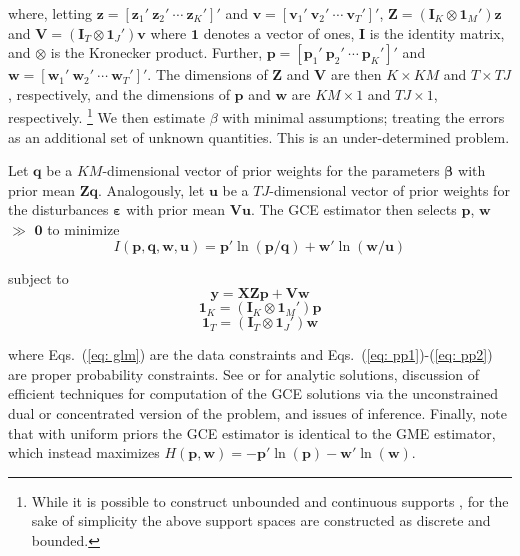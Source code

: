 \documentclass{elsarticle}
\begin{document}
\noindent
where, letting $\mathbf{z}=[\mathbf{z}_1' ~ \mathbf{z}_2' ~ \cdots ~ 
\mathbf{z}_K' ]'$ and $\mathbf{v}=[\mathbf{v}_1' ~ \mathbf{v}_2' ~ 
\cdots ~ \mathbf{v}_T' ]'$, 
$\mathbf{Z}= (\mathbf{I}_K \otimes \mathbf{1}_M')\mathbf{z}$ and
$\mathbf{V}= (\mathbf{I}_T \otimes \mathbf{1}_J')\mathbf{v}$
where $\mathbf{1}$ denotes a vector of ones, $\mathbf{I}$ is the 
identity matrix, and $\otimes$ is the Kronecker product.
Further, $\mathbf{p} = [\mathbf{p}_1' ~ \mathbf{p}_2' ~ \cdots ~ 
\mathbf{p}_K' ]'$ and $\mathbf{w} = [\mathbf{w}_1' ~ \mathbf{w}_2' 
~ \cdots ~ \mathbf{w}_T' ]'$.
The dimensions of $\mathbf{Z}$ and $\mathbf{V}$ are then 
$K \times KM$ and $T \times TJ$, respectively, and the dimensions of 
$\mathbf{p}$ and $\mathbf{w}$ are $KM \times 1$ and $TJ \times 1$, 
respectively.%
\footnote{While it is possible to construct unbounded 
and continuous supports \citep{golan2012}, for the sake of simplicity the above 
support spaces are constructed as discrete and bounded.} 
We then estimate $\beta$ with minimal assumptions; treating the errors as an additional 
set of unknown quantities.
This is an under-determined problem. 

Let $\mathbf{q}$ be a $KM$-dimensional vector of prior weights for the 
parameters $\mathbf{\beta}$ with prior mean $\mathbf{Zq}$.
Analogously, let $\mathbf{u}$ be a $TJ$-dimensional vector of prior weights 
for the disturbances $\mathbf{\varepsilon}$ with prior mean $\mathbf{Vu}$.
The GCE estimator then selects $\mathbf{p}$, $\mathbf{w}$ $\gg$ 
$\mathbf{0}$ to minimize 
\begin{equation}
I({\mathbf{p}, \mathbf{q}, \mathbf{w}, \mathbf{u}}) = 
\mathbf{p}' \ln (\mathbf{p}/\mathbf{q}) + 
\mathbf{w}' \ln (\mathbf{w}/\mathbf{u})
\label{eq: ce}
\end{equation}

\noindent
subject to
\begin{equation}
\mathbf{y} = \mathbf{X Z p} 
+ \mathbf{V w}
\label{eq: glm}
\end{equation}
\begin{equation}
\mathbf{1}_K = (\mathbf{I}_K \otimes \mathbf{1}_M')\mathbf{p}
\label{eq: pp1}
\end{equation}
\begin{equation}
\mathbf{1}_T = (\mathbf{I}_T \otimes \mathbf{1}_J')\mathbf{w}
\label{eq: pp2}
\end{equation}

\noindent
where Eqs.\ (\ref{eq: glm}) are the data constraints and Eqs.\ 
(\ref{eq: pp1})-(\ref{eq: pp2}) are proper probability constraints.
See \citet[Chap.\ 6]{golan1996} or \citet[Chap.\ 6]{golan2008} for analytic solutions, 
discussion of efficient techniques for computation of the GCE solutions via the 
unconstrained dual or concentrated version of the problem, and issues of inference.
Finally, note that with uniform priors the GCE estimator is identical to 
the GME estimator, which instead maximizes $H(\mathbf{p},\mathbf{w}) 
= - \mathbf{p}' \ln (\mathbf{p}) - \mathbf{w}' \ln (\mathbf{w})$.
\end{document}
